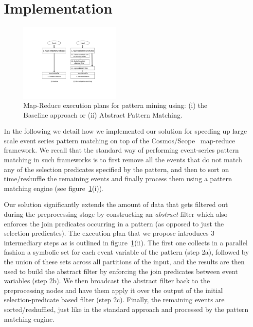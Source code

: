 \section{Implementation}
\label{sec:implementation}

\begin{figure}[tp]
\centering
\includegraphics[clip, trim=5.6cm 4.5cm 6.3cm 4.2cm, 
width=0.45\textwidth]{graphs_query_plan.pdf}
\caption{Map-Reduce execution plans for pattern mining using: (i) the Baseline 
approach or (ii) Abstract Pattern Matching.}
\label{fig:query_plan}
\end{figure}


In the following we detail how we implemented our solution for speeding up 
large scale event series pattern matching on top of the 
Cosmos/Scope~\cite{Chaiken:2008} map-reduce framework.
We recall that the standard way of performing event-series pattern matching in 
such frameworks is to first remove all the events that do not match any of the 
selection predicates specified by the pattern, and then to sort on 
time/reshuffle the remaining events and finally process them using a pattern 
matching engine (see figure~\ref{fig:query_plan}(i)).

Our solution significantly extends the amount of data that gets filtered out 
during the preprocessing stage by constructing an {\em abstract} filter which 
also enforces the join predicates occurring in a pattern (as opposed to just 
the selection predicates).
The execution plan that we propose introduces 3 intermediary steps as is 
outlined in figure~\ref{fig:query_plan}(ii).
The first one collects in a parallel fashion a symbolic set for each event 
variable of the pattern (step 2a), followed by the union of these sets across 
all partitions of the input, and the results are then used to build the 
abstract filter by enforcing the join predicates between event variables (step 
2b). 
We then broadcast the abstract filter back to the preprocessing nodes and have 
them apply it over the output of the initial selection-predicate based filter 
(step 2c). 
Finally, the remaining events are sorted/reshuffled, just like in the standard 
approach and processed by the pattern matching engine. 


